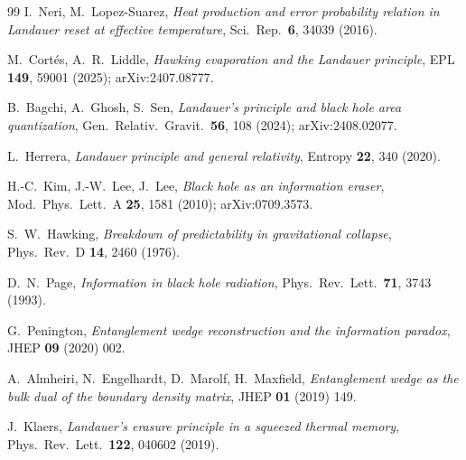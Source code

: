 \documentclass[aps,prd,twocolumn,showpacs,preprintnumbers,amsmath,amssymb,longbibliography]{revtex4-2}
\begin{document}
\begin{thebibliography}{99}
I.~Neri, M.~Lopez-Suarez,
\textit{Heat production and error probability relation in Landauer reset at 
effective temperature},
Sci.\ Rep.\ \textbf{6}, 34039 (2016).

M.~Cort\'es, A.~R.~Liddle,
\textit{Hawking evaporation and the Landauer principle},
EPL \textbf{149}, 59001 (2025); arXiv:2407.08777.

B.~Bagchi, A.~Ghosh, S.~Sen,
\textit{Landauer's principle and black hole area quantization},
Gen.\ Relativ.\ Gravit.\ \textbf{56}, 108 (2024); arXiv:2408.02077.

L.~Herrera,
\textit{Landauer principle and general relativity},
Entropy \textbf{22}, 340 (2020).

H.-C.~Kim, J.-W.~Lee, J.~Lee,
\textit{Black hole as an information eraser},
Mod.\ Phys.\ Lett.\ A \textbf{25}, 1581 (2010); arXiv:0709.3573.

S.~W.~Hawking,
\textit{Breakdown of predictability in gravitational collapse},
Phys.\ Rev.\ D \textbf{14}, 2460 (1976).

D.~N.~Page,
\textit{Information in black hole radiation},
Phys.\ Rev.\ Lett.\ \textbf{71}, 3743 (1993).

G.~Penington,
\textit{Entanglement wedge reconstruction and the information paradox},
JHEP \textbf{09} (2020) 002.

A.~Almheiri, N.~Engelhardt, D.~Marolf, H.~Maxfield,
\textit{Entanglement wedge as the bulk dual of the boundary density matrix},
JHEP \textbf{01} (2019) 149.

J.~Klaers,
\textit{Landauer's erasure principle in a squeezed thermal memory},
Phys.\ Rev.\ Lett.\ \textbf{122}, 040602 (2019).

\end{thebibliography}
\end{document}
